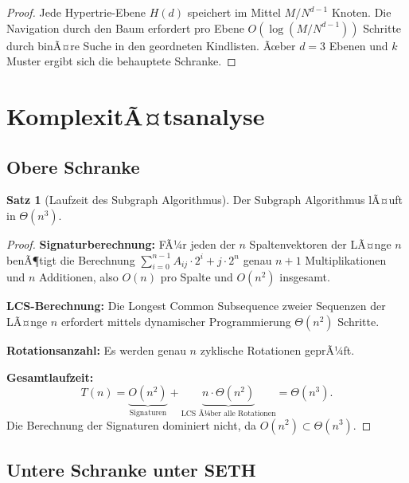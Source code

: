 ﻿\documentclass[a4paper,12pt]{article}
\theoremstyle{definition}
\newtheorem{satz}{Satz}
\begin{document}
\begin{proof}
Jede Hypertrie-Ebene $H(d)$ speichert im Mittel $M/N^{d-1}$ Knoten. Die Navigation
durch den Baum erfordert pro Ebene $O(\log(M/N^{d-1}))$ Schritte durch binÃ¤re Suche
in den geordneten Kindlisten. Ãœber $d=3$ Ebenen und $k$ Muster ergibt sich die
behauptete Schranke.
\end{proof}

\section{KomplexitÃ¤tsanalyse}
\label{sec:komplexitaet}

\subsection{Obere Schranke}

\begin{satz}[Laufzeit des Subgraph Algorithmus]
\label{satz:laufzeit}
Der Subgraph Algorithmus lÃ¤uft in $\Theta(n^3)$.
\end{satz}

\begin{proof}
\textbf{Signaturberechnung:} FÃ¼r jeden der $n$ Spaltenvektoren der LÃ¤nge $n$ benÃ¶tigt
die Berechnung $\sum_{i=0}^{n-1} A_{ij} \cdot 2^i + j \cdot 2^n$ genau $n+1$
Multiplikationen und $n$ Additionen, also $O(n)$ pro Spalte und $O(n^2)$ insgesamt.

\textbf{LCS-Berechnung:} Die Longest Common Subsequence zweier Sequenzen der LÃ¤nge $n$
erfordert mittels dynamischer Programmierung $\Theta(n^2)$ Schritte.

\textbf{Rotationsanzahl:} Es werden genau $n$ zyklische Rotationen geprÃ¼ft.

\textbf{Gesamtlaufzeit:}
\[
  T(n) = \underbrace{O(n^2)}_{\text{Signaturen}} +
         \underbrace{n \cdot \Theta(n^2)}_{\text{LCS Ã¼ber alle Rotationen}}
       = \Theta(n^3).
\]
Die Berechnung der Signaturen dominiert nicht, da $O(n^2) \subset \Theta(n^3)$.
\end{proof}

\subsection{Untere Schranke unter SETH}
\end{document}
